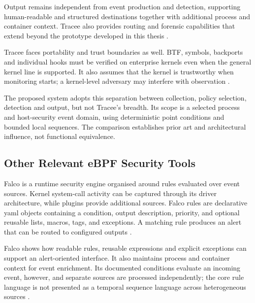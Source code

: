 Output remains independent from event production and detection, supporting
human-readable and structured destinations together with additional process and
container context. Tracee also provides routing and forensic capabilities that
extend beyond the prototype developed in this thesis
\cite{aquasecurity_tracee_output,aquasecurity_tracee_overview}.

Tracee faces portability and trust boundaries as well. BTF, symbols, backports
and individual hooks must be verified on enterprise kernels even when the
general kernel line is supported. It also assumes that the kernel is trustworthy
when monitoring starts; a kernel-level adversary may interfere with observation
\cite{aquasecurity_tracee_requirements,
aquasecurity_tracee_security_model}.

The proposed system adopts this separation between collection, policy
selection, detection and output, but not Tracee's breadth. Its scope is a
selected process and host-security event domain, using deterministic point
conditions and bounded local sequences. The comparison establishes prior art
and architectural influence, not functional equivalence.

\subsection{Other Relevant eBPF Security Tools}
\label{subsec:other-ebpf-security-tools}

Falco is a runtime security engine organised around rules evaluated over event
sources. Kernel system-call activity can be captured through its driver
architecture, while plugins provide additional sources. Falco rules are
declarative \gls{yaml} objects containing a condition, output description, priority,
and optional reusable lists, macros, tags, and exceptions. A matching rule
produces an alert that can be routed to configured outputs
\cite{falcosecurity_falco_kernel_architecture,falcosecurity_falco_rules,
falcosecurity_falco_outputs}.

Falco shows how readable rules, reusable expressions and explicit exceptions
can support an alert-oriented interface. It also maintains process and
container context for event enrichment. Its documented conditions evaluate an
incoming event, however, and separate sources are processed independently; the
core rule language is not presented as a temporal sequence language across
heterogeneous sources \cite{falcosecurity_falco_event_sources,
falcosecurity_falco_rule_conditions}.

